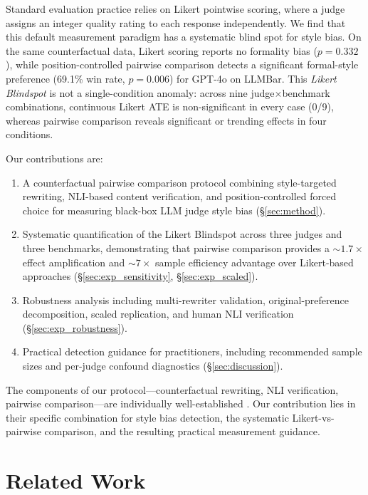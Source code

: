 \documentclass[11pt,a4paper]{article}
\begin{document}
Standard evaluation practice relies on Likert pointwise scoring, where a judge assigns an integer quality rating to each response independently.
We find that this default measurement paradigm has a systematic blind spot for style bias.
On the same counterfactual data, Likert scoring reports no formality bias ($p{=}0.332$), while position-controlled pairwise comparison detects a significant formal-style preference (69.1\% win rate, $p{=}0.006$) for GPT-4o on LLMBar.
This \emph{Likert Blindspot} is not a single-condition anomaly: across nine judge$\times$benchmark combinations, continuous Likert ATE is non-significant in every case (0/9), whereas pairwise comparison reveals significant or trending effects in four conditions.

Our contributions are:
\begin{enumerate}
    \item A counterfactual pairwise comparison protocol combining style-targeted rewriting, NLI-based content verification, and position-controlled forced choice for measuring black-box LLM judge style bias (\S\ref{sec:method}).
    \item Systematic quantification of the Likert Blindspot across three judges and three benchmarks, demonstrating that pairwise comparison provides a ${\sim}1.7\times$ effect amplification and ${\sim}7\times$ sample efficiency advantage over Likert-based approaches (\S\ref{sec:exp_sensitivity}, \S\ref{sec:exp_scaled}).
    \item Robustness analysis including multi-rewriter validation, original-preference decomposition, scaled replication, and human NLI verification (\S\ref{sec:exp_robustness}).
    \item Practical detection guidance for practitioners, including recommended sample sizes and per-judge confound diagnostics (\S\ref{sec:discussion}).
\end{enumerate}

The components of our protocol---counterfactual rewriting, NLI verification, pairwise comparison---are individually well-established \cite{rate2025,mir2019,kiritchenko2017}.
Our contribution lies in their specific combination for style bias detection, the systematic Likert-vs-pairwise comparison, and the resulting practical measurement guidance.

\section{Related Work}
\label{sec:related}
\end{document}
